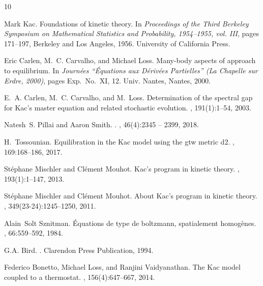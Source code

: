 \documentclass{article}
\begin{document}



\begin{thebibliography}{10}

Mark Kac.
\newblock Foundations of kinetic theory.
\newblock In {\em Proceedings of the {T}hird {B}erkeley {S}ymposium on
  {M}athematical {S}tatistics and {P}robability, 1954--1955, vol. {III}}, pages
  171--197, Berkeley and Los Angeles, 1956. University of California Press.

Eric Carlen, M.~C. Carvalho, and Michael Loss.
\newblock Many-body aspects of approach to equilibrium.
\newblock In {\em Journ\'ees ``\'{E}quations aux {D}\'eriv\'ees {P}artielles''
  ({L}a {C}hapelle sur {E}rdre, 2000)}, pages Exp.\ No.\ XI, 12. Univ. Nantes,
  Nantes, 2000.

E.~A. Carlen, M.~C. Carvalho, and M.~Loss.
\newblock Determination of the spectral gap for {K}ac's master equation and
  related stochastic evolution.
, 191(1):1--54, 2003.

Natesh~S. Pillai and Aaron Smith.
.
, 46(4):2345 -- 2399, 2018.

H.~Tossounian.
\newblock Equilibration in the {K}ac model using the gtw metric d2.
, 169:168--186, 2017.

St\'ephane Mischler and Cl\'ement Mouhot.
\newblock Kac's program in kinetic theory.
, 193(1):1--147, 2013.

St\'ephane Mischler and Cl\'ement Mouhot.
\newblock About {K}ac's program in kinetic theory.
, 349(23-24):1245--1250, 2011.

Alain~Solt Sznitman.
\newblock Équations de type de boltzmann, spatialement homogènes.
, 66:559--592, 1984.

G.A. Bird.
.
\newblock Clarendon Press Publication, 1994.

Federico Bonetto, Michael Loss, and Ranjini Vaidyanathan.
\newblock The {K}ac model coupled to a thermostat.
, 156(4):647--667, 2014.


\end{thebibliography}
\end{document}
